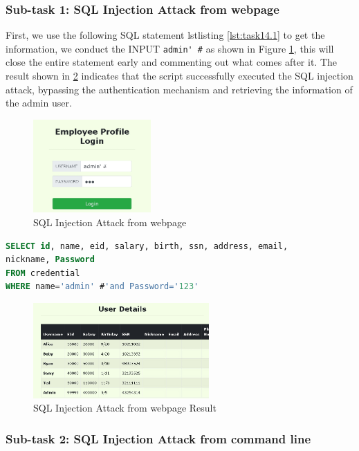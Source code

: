 \documentclass[a4paper,11pt]{article}
\begin{document}
\subsubsection{Sub-task 1: SQL Injection Attack from webpage}
First, we use the following SQL statement lstlisting \ref{lst:task14.1} to get the information, we conduct the INPUT \verb|admin' #| as shown in Figure \ref{fig:task14.1}, this will close the entire statement early and commenting out what comes after it. The result shown in \ref{fig:task14.2} indicates that the script successfully executed the SQL injection attack, bypassing the authentication mechanism and retrieving the information of the admin user. 
\begin{figure}[h]
    \centering
       \includegraphics[width=0.4\textwidth]{figures/task14/task14.1.png}
    \caption{SQL Injection Attack from webpage}\label{fig:task14.1}
\end{figure}

\begin{lstlisting}[caption={select Alice's information},label={lst:task14.1},language=SQL,breaklines=true]
SELECT id, name, eid, salary, birth, ssn, address, email,
nickname, Password 
FROM credential
WHERE name='admin' #'and Password='123'
\end{lstlisting}

\begin{figure}[h]
    \centering
       \includegraphics[width=0.6\textwidth]{figures/task14/task14.2.png}
    \caption{SQL Injection Attack from webpage Result}\label{fig:task14.2}
\end{figure}

\subsubsection{Sub-task 2: SQL Injection Attack from command line}


%
\end{document}
